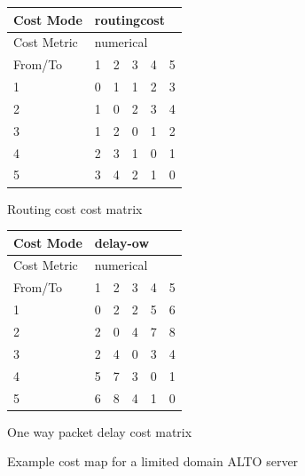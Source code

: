 \begin{figure}
    \centering
    \begin{subtable}{.4\linewidth}
        \centering
        \begin{tabular}{|l|l|l|l|l|l|}
        \hline
        Cost Mode   & \multicolumn{5}{|l|}{routingcost} \\ \hline
        Cost Metric & \multicolumn{5}{|l|}{numerical}   \\ \hline
        From/To     & 1    & 2     & 3   & 4   & 5      \\ \hline
        1           & 0    & 1     & 1   & 2   & 3      \\ \hline
        2           & 1    & 0     & 2   & 3   & 4      \\ \hline
        3           & 1    & 2     & 0   & 1   & 2      \\ \hline
        4           & 2    & 3     & 1   & 0   & 1      \\ \hline
        5           & 3    & 4     & 2   & 1   & 0      \\ \hline
        \end{tabular}
    \caption{Routing cost cost matrix}
    \end{subtable}
    \begin{subtable}{.4\linewidth}
        \centering
        \begin{tabular}{|l|l|l|l|l|l|}
        \hline
        Cost Mode   & \multicolumn{5}{|l|}{delay-ow}    \\ \hline
        Cost Metric & \multicolumn{5}{|l|}{numerical}   \\ \hline
        From/To     & 1    & 2     & 3   & 4   & 5      \\ \hline
        1           & 0    & 2     & 2   & 5   & 6      \\ \hline
        2           & 2    & 0     & 4   & 7   & 8      \\ \hline
        3           & 2    & 4     & 0   & 3   & 4      \\ \hline
        4           & 5    & 7     & 3   & 0   & 1      \\ \hline
        5           & 6    & 8     & 4   & 1   & 0      \\ \hline
        \end{tabular}
    \caption{One way packet delay cost matrix}
    \end{subtable}

    \caption{Example cost map for a limited domain ALTO server}
    \label{table:costmap-example-non-boundary}
\end{figure}

